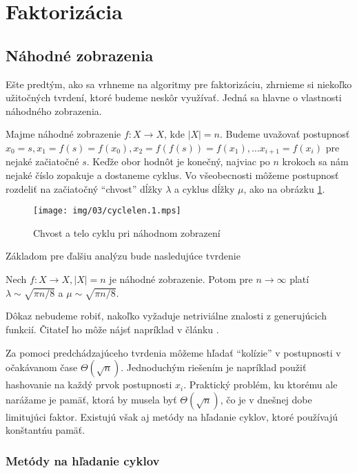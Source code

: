 \section{Faktorizácia}

\subsection{Náhodné zobrazenia}
Ešte predtým, ako sa vrhneme na algoritmy pre faktorizáciu, zhrnieme
si niekoľko užitočných tvrdení, ktoré budeme neskôr využívať. Jedná sa
hlavne o vlastnosti náhodného zobrazenia.

Majme náhodné zobrazenie $f:X \rightarrow X$, kde $|X| = n$.
Budeme uvažovať postupnosť $x_0 = s, x_1=f(s)=f(x_0), x_2 =
f(f(s))=f(x_1), \dots x_{i+1} = f(x_{i})$ pre nejaké začiatočné $s$.
Keďže obor hodnôt je konečný, najviac po $n$ krokoch sa nám nejaké
číslo zopakuje a dostaneme cyklus. Vo všeobecnosti môžeme postupnosť
rozdeliť na začiatočný ``chvost'' dĺžky $\lambda$ a cyklus dĺžky
$\mu$, ako na obrázku \ref{fig:cyclelen}.

\begin{figure}[h!]
    \caption{Chvost a telo cyklu pri náhodnom zobrazení}
    \label{fig:cyclelen}
    \centering
    \texttt{[image: img/03/cyclelen.1.mps]}
\end{figure}

Základom pre ďalšiu analýzu bude nasledujúce tvrdenie
\begin{lema}
    Nech $f:X\rightarrow X, |X|=n$ je náhodné zobrazenie.
    Potom pre $n\rightarrow \infty$ platí
    $\lambda \sim \sqrt{\pi n/8}$ a 
    $\mu \sim \sqrt{\pi n/8}$.
\end{lema}
\begin{dokaz}
    Dôkaz nebudeme robiť, nakoľko vyžaduje netriviálne znalosti
    z generujúcich funkcií. Čitateľ ho môže nájsť napríklad v článku
    \cite{randommap}.
\end{dokaz}

Za pomoci predchádzajúceho tvrdenia môžeme hľadať ``kolízie'' v
postupnosti v očakávanom čase $\Theta(\sqrt{n})$.
Jednoduchým riešením je napríklad použiť hashovanie na každý prvok
postupnosti $x_i$. Praktický problém, ku ktorému ale narážame je
pamäť, ktorá by musela byť $\Theta(\sqrt{n})$, čo je v dnešnej dobe
limitujúci faktor. Existujú však aj metódy na hľadanie cyklov,
ktoré používajú konštantńu pamäť.

\subsubsection{Metódy na hľadanie cyklov}


